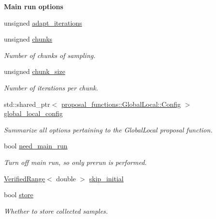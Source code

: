 \begin{Indent}{\bf Main run options}\par
{\em \label{_amgrp03ae0482f9408262df632e84148db84d}
 }\begin{DoxyCompactItemize}
\item 
unsigned \hyperlink{classeos_1_1MarkovChainSampler_1_1Config_ad90feb40e232329acf8a1fb785ed2d87}{adapt\_\-iterations}
\item 
unsigned \hyperlink{classeos_1_1MarkovChainSampler_1_1Config_a5e5751b084b471b08aa6f33513c28047}{chunks}
\begin{DoxyCompactList}\small\item\em Number of chunks of sampling. \item\end{DoxyCompactList}\item 
unsigned \hyperlink{classeos_1_1MarkovChainSampler_1_1Config_a3286979755ea75bd563fb66fba9e5330}{chunk\_\-size}
\begin{DoxyCompactList}\small\item\em Number of iterations per chunk. \item\end{DoxyCompactList}\item 
std::shared\_\-ptr$<$ \hyperlink{structeos_1_1proposal__functions_1_1GlobalLocal_1_1Config}{proposal\_\-functions::GlobalLocal::Config} $>$ \hyperlink{classeos_1_1MarkovChainSampler_1_1Config_ac717ab2f0caa32cc13b5e382f8b19cec}{global\_\-local\_\-config}
\begin{DoxyCompactList}\small\item\em Summarize all options pertaining to the GlobalLocal proposal function. \item\end{DoxyCompactList}\item 
bool \hyperlink{classeos_1_1MarkovChainSampler_1_1Config_a1efc4d04039ba60a1f4c27ae28fe1554}{need\_\-main\_\-run}
\begin{DoxyCompactList}\small\item\em Turn off main run, so only prerun is performed. \item\end{DoxyCompactList}\item 
\hyperlink{classeos_1_1VerifiedRange}{VerifiedRange}$<$ double $>$ \hyperlink{classeos_1_1MarkovChainSampler_1_1Config_a8db6eb333e22a68f8b7abbd96b02b88c}{skip\_\-initial}
\item 
bool \hyperlink{classeos_1_1MarkovChainSampler_1_1Config_a61732b63555e375ca22b7c31e3df12b6}{store}
\begin{DoxyCompactList}\small\item\em Whether to store collected samples. \item\end{DoxyCompactList}\end{DoxyCompactItemize}
\end{Indent}
